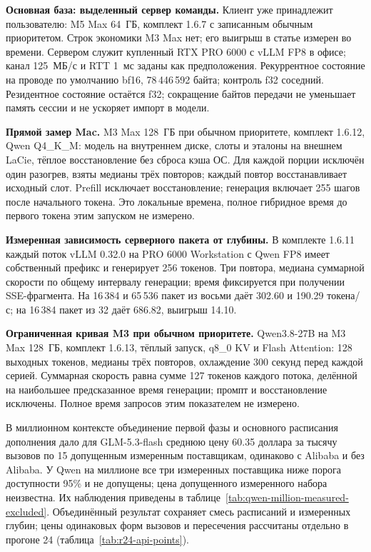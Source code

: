 \textbf{Основная база: выделенный сервер команды.} Клиент уже принадлежит пользователю: M5 Max 64~ГБ, комплект 1.6.7 с записанным обычным приоритетом. Строк экономики M3 Max нет; его выигрыш в статье измерен во времени. Сервером служит купленный RTX PRO 6000 с vLLM FP8 в офисе; канал 125~МБ/с и RTT 1~мс заданы как предположения. Рекуррентное состояние на проводе по умолчанию bf16, 78\,446\,592 байта; контроль f32 соседний. Резидентное состояние остаётся f32; сокращение байтов передачи не уменьшает память сессии и не ускоряет импорт в модели.

\textbf{Прямой замер Mac.} M3 Max 128~ГБ при обычном приоритете, комплект 1.6.12, Qwen Q4\_K\_M: модель на внутреннем диске, слоты и эталоны на внешнем LaCie, тёплое восстановление без сброса кэша ОС. Для каждой порции исключён один разогрев, взяты медианы трёх повторов; каждый повтор восстанавливает исходный слот. Prefill исключает восстановление; генерация включает 255 шагов после начального токена. Это локальные времена, полное гибридное время до первого токена этим запуском не измерено.

\textbf{Измеренная зависимость серверного пакета от глубины.} В комплекте 1.6.11 каждый поток vLLM 0.32.0 на PRO 6000 Workstation с Qwen FP8 имеет собственный префикс и генерирует 256 токенов. Три повтора, медиана суммарной скорости по общему интервалу генерации; время фиксируется при получении SSE-фрагмента. На 16\,384 и 65\,536 пакет из восьми даёт 302.60 и 190.29 токена/с; на 16\,384 пакет из 32 даёт 686.82, выигрыш 14.10.

\textbf{Ограниченная кривая M3 при обычном приоритете.} Qwen3.8-27B на M3 Max 128~ГБ, комплект 1.6.13, тёплый запуск, q8\_0 KV и Flash Attention: 128 выходных токенов, медианы трёх повторов, охлаждение 300 секунд перед каждой серией. Суммарная скорость равна сумме 127 токенов каждого потока, делённой на наибольшее предсказанное время генерации; промпт и восстановление исключены. Полное время запросов этим показателем не измерено.

В миллионном контексте объединение первой фазы и основного расписания дополнения дало для GLM-5.3-flash среднюю цену 60.35 доллара за тысячу вызовов по 15 допущенным измеренным поставщикам, одинаково с Alibaba и без Alibaba. У Qwen на миллионе все три измеренных поставщика ниже порога доступности 95\% и не допущены; цена допущенного измеренного набора неизвестна. Их наблюдения приведены в таблице~\ref{tab:qwen-million-measured-excluded}. Объединённый результат сохраняет смесь расписаний и измеренных глубин; цены одинаковых форм вызовов и пересечения рассчитаны отдельно в прогоне 24 (таблица~\ref{tab:r24-api-points}).

